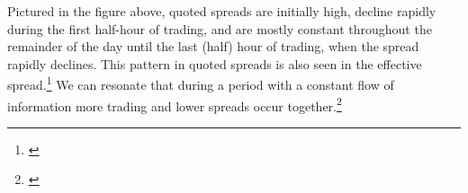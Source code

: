 \documentclass[12pt,a4paper]{cau_thesis}
\begin{document}
Pictured in the figure above, quoted spreads are initially high,
decline rapidly during the first half-hour of trading, and are mostly
constant throughout the remainder of the day until the last (half)
hour of trading, when the spread rapidly declines. This pattern in
quoted spreads is also seen in the effective
spread.\footnote{\cite[See ][, p.75]{cartea2015algorithmic}} We can
resonate that during a period with a constant flow of information
more trading and lower spreads occur together.\footnote{\cite[See ][,
        p.75]{cartea2015algorithmic}}
\end{document}
